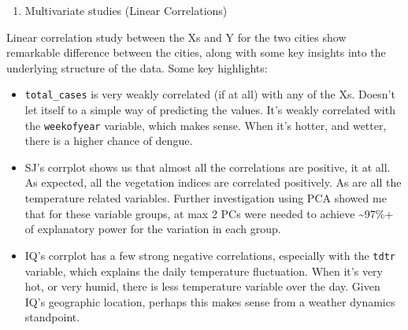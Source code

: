 \documentclass[floatsintext,man]{apa6}
\providecommand{\tightlist}{%
  \setlength{\itemsep}{0pt}\setlength{\parskip}{0pt}}
\theoremstyle{definition}
\theoremstyle{definition}
\theoremstyle{definition}
\theoremstyle{remark}
\begin{document}
\newpage

\begin{enumerate}
\def\labelenumi{\arabic{enumi}.}
\tightlist
\item
  Multivariate studies (Linear Correlations)
\end{enumerate}

Linear correlation study between the Xs and Y for the two cities show
remarkable difference between the cities, along with some key insights
into the underlying structure of the data. Some key highlights:

\begin{itemize}
\item
  \texttt{total\_cases} is very weakly correlated (if at all) with any
  of the Xs. Doesn't let itself to a simple way of predicting the
  values. It's weakly correlated with the \texttt{weekofyear} variable,
  which makes sense. When it's hotter, and wetter, there is a higher
  chance of dengue.
\item
  SJ's corrplot shows us that almost all the correlations are positive,
  it at all. As expected, all the vegetation indices are correlated
  positively. As are all the temperature related variables. Further
  investigation using PCA showed me that for these variable groups, at
  max 2 PCs were needed to achieve \textasciitilde{}97\%+ of explanatory
  power for the variation in each group.
\item
  IQ's corrplot has a few strong negative correlations, especially with
  the \texttt{tdtr} variable, which explains the daily temperature
  fluctuation. When it's very hot, or very humid, there is less
  temperature variable over the day. Given IQ's geographic location,
  perhaps this makes sense from a weather dynamics standpoint.
\end{itemize}
\end{document}
